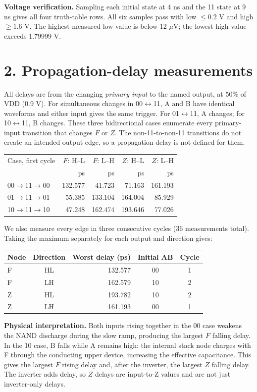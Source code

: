 \documentclass[11pt,a4paper]{article}
\begin{document}
\textbf{Voltage verification.} Sampling each initial state at 4 ns and the 11 state at 9 ns gives all four truth-table rows. All six samples pass with low $\le0.2$ V and high $\ge1.6$ V. The highest measured low value is below 12 $\mu$V; the lowest high value exceeds 1.79999 V.
\newpage
\section*{2. Propagation-delay measurements}
All delays are from the changing \emph{primary input} to the named output, at 50\% of VDD (0.9 V). For simultaneous changes in 00$\leftrightarrow$11, A and B have identical waveforms and either input gives the same trigger. For 01$\leftrightarrow$11, A changes; for 10$\leftrightarrow$11, B changes.
These three bidirectional cases enumerate every primary-input transition that changes $F$ or $Z$. The non-11-to-non-11 transitions do not create an intended output edge, so a propagation delay is not defined for them.
\begin{center}\begin{tabular}{lrrrr}\toprule
Case, first cycle&$F$: H--L&$F$: L--H&$Z$: H--L&$Z$: L--H\\
&ps&ps&ps&ps\\\midrule
00$\to$11$\to$00&132.577&41.723&71.163&161.193\\
01$\to$11$\to$01&55.385&133.104&164.004&85.929\\
10$\to$11$\to$10&47.248&162.474&193.646&77.026\\
\bottomrule\end{tabular}\end{center}
We also measure every edge in three consecutive cycles (36 measurements total). Taking the maximum separately for each output and direction gives:
\begin{center}\begin{tabular}{lcrcc}\toprule
Node&Direction&Worst delay (ps)&Initial AB&Cycle\\\midrule
F&HL&132.577&00&1\\
F&LH&162.579&10&2\\
Z&HL&193.782&10&2\\
Z&LH&161.193&00&1\\
\bottomrule\end{tabular}\end{center}
\textbf{Physical interpretation.} Both inputs rising together in the 00 case weakens the NAND discharge during the slow ramp, producing the largest $F$ falling delay. In the 10 case, B falls while A remains high: the internal stack node charges with F through the conducting upper device, increasing the effective capacitance. This gives the largest $F$ rising delay and, after the inverter, the largest $Z$ falling delay. The inverter adds delay, so $Z$ delays are input-to-Z values and are not just inverter-only delays.
\end{document}
